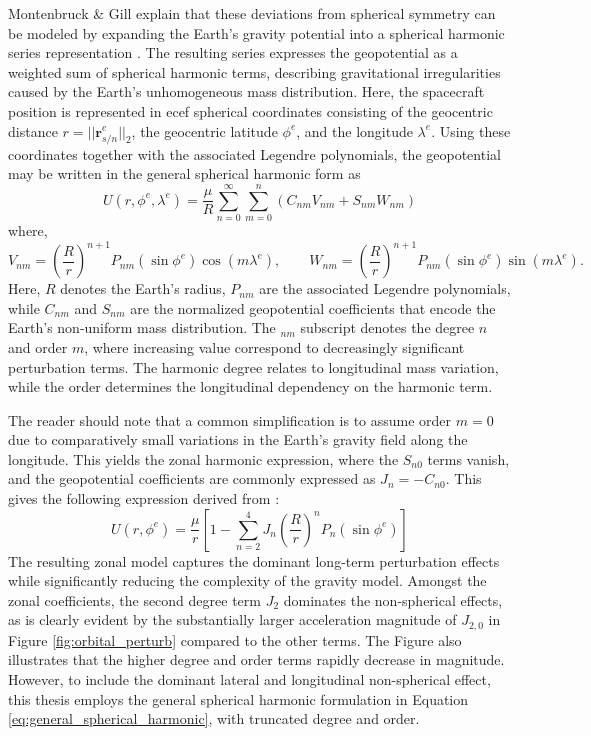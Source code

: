 Montenbruck \& Gill explain that these deviations from spherical symmetry can be modeled by expanding the Earth's gravity potential into a spherical harmonic series representation \cite{montenbruck2000}. The resulting series expresses the geopotential as a weighted sum of spherical harmonic terms, describing gravitational irregularities caused by the Earth's unhomogeneous mass distribution. Here, the spacecraft position is represented in \gls{ecef} spherical coordinates consisting of the geocentric distance $r = ||\textbf{r}^e_{s/n}||_2$, the geocentric latitude $\phi^e$, and the longitude $\lambda^e$. Using these coordinates together with the associated Legendre polynomials, the geopotential may be written in the general spherical harmonic form as
\begin{equation}
U(r, \phi^e, \lambda^e) = \frac{\mu}{R} \sum_{n=0}^{\infty} \sum_{m=0}^{n} \left(C_{nm}V_{nm} + S_{nm}W_{nm}\right)
\label{eq:general_spherical_harmonic}
\end{equation}
where, 
\begin{equation}
V_{nm} = \left(\frac{R}{r}\right)^{n+1} P_{nm}(\sin\phi^e)\cos(m\lambda^e),
\qquad
W_{nm} = \left(\frac{R}{r}\right)^{n+1} P_{nm}(\sin\phi^e)\sin(m\lambda^e).
\label{eq:spherical_harmonics}
\end{equation}
Here, $R$ denotes the Earth's radius, $P_{nm}$ are the associated Legendre polynomials, while $C_{nm}$ and $S_{nm}$ are the normalized geopotential coefficients that encode the Earth's non-uniform mass distribution. The $_{nm}$ subscript denotes the degree $n$ and order $m$, where increasing value correspond to decreasingly significant perturbation terms. The harmonic degree relates to longitudinal mass variation, while the order determines the longitudinal dependency on the harmonic term. 

The reader should note that a common simplification is to assume order $m=0$ due to comparatively small variations in the Earth's gravity field along the longitude. This yields the zonal harmonic expression, where the $S_{n0}$ terms vanish, and the geopotential coefficients are commonly expressed as $J_n = -C_{n0}$. This gives the following expression derived from \cite{montenbruck2000, vallado2001fundamentals}:
\begin{equation}
    U(r, \phi^e) = \frac{\mu}{r} \left[ 1 - \sum_{n=2}^{4} J_n \left( \frac{R}{r} \right)^n P_n(\sin \phi^e) \right]
\end{equation}
The resulting zonal model captures the dominant long-term perturbation effects while significantly reducing the complexity of the gravity model. Amongst the zonal coefficients, the second degree term $J_2$ dominates the non-spherical effects, as is clearly evident by the substantially larger acceleration magnitude of $J_{2,0}$ in Figure \ref{fig:orbital_perturb} compared to the other terms. The Figure also illustrates that the higher degree and order terms rapidly decrease in magnitude. However, to include the dominant lateral and longitudinal non-spherical effect, this thesis employs the general spherical harmonic formulation in Equation \ref{eq:general_spherical_harmonic}, with truncated degree and order.


